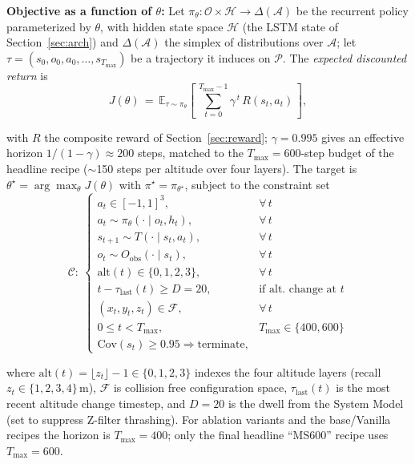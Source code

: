 \documentclass[runningheads]{llncs}
\begin{document}
\noindent\textbf{Objective as a function of $\theta$:} Let $\pi_\theta\!:\!\mathcal{O}\!\times\!\mathcal{H}\!\to\!\Delta(\mathcal{A})$ be the recurrent policy parameterized by $\theta$, with hidden state space $\mathcal{H}$ (the LSTM state of Section~\ref{sec:arch}) and $\Delta(\mathcal{A})$ the simplex of distributions over $\mathcal{A}$; let $\tau\!=\!(s_0,o_0,a_0,\ldots,s_{T_{\max}})$ be a trajectory it induces on $\mathcal{P}$. The \emph{expected discounted return} is
\vspace{-2pt}
\begin{equation}
J(\theta) \,=\, \mathbb{E}_{\tau\sim\pi_\theta}\!\left[\,\sum_{t=0}^{T_{\max}-1}\gamma^{\,t}\, R(s_t,a_t)\,\right],
\label{eq:J}
\end{equation}
\vspace{-4pt}

\noindent with $R$ the composite reward of Section~\ref{sec:reward}; $\gamma\!=\!0.995$ gives an effective horizon $1/(1-\gamma)\!\approx\!200$ steps, matched to the $T_{\max}\!=\!600$-step budget of the headline recipe ($\sim$150 steps per altitude over four layers). The target is $\theta^{\star} = \arg\max_{\theta} J(\theta)$ with $\pi^{\star} = \pi_{\theta^{\star}}$, subject to the constraint set
\vspace{-4pt}
{\renewcommand{\arraystretch}{0.80}%
\begin{equation}
\mathcal{C}:\
\begin{cases}
a_t \in [-1,1]^3, & \forall\, t \\
a_t \sim \pi_\theta(\cdot\!\mid\!o_t,h_t), & \forall\, t \\
s_{t+1} \sim T(\cdot\!\mid\!s_t,a_t), & \forall\, t \\
o_t \sim O_{\text{obs}}(\cdot\!\mid\!s_t), & \forall\, t \\
\mathrm{alt}(t) \in \{0,1,2,3\}, & \forall\, t \\
t - \tau_{\text{last}}(t) \geq D = 20, & \text{if alt.\ change at } t \\
(x_t, y_t, z_t) \in \mathcal{F}, & \forall\, t \\
0 \leq t < T_{\max}, & T_{\max}\!\in\!\{400,600\} \\
\mathrm{Cov}(s_t)\!\geq\!0.95 \Rightarrow \text{terminate}, &
\end{cases}
\label{eq:constraints}
\end{equation}}%
\vspace{-4pt}

\noindent where $\mathrm{alt}(t)\!=\!\lfloor z_t\rfloor\!-\!1\!\in\!\{0,1,2,3\}$ indexes the four altitude layers (recall $z_t\!\in\!\{1,2,3,4\}\,\text{m}$), $\mathcal{F}$ is collision free configuration space, $\tau_{\text{last}}(t)$ is the most recent altitude change timestep, and $D\!=\!20$ is the dwell from the System Model (set to suppress Z-filter thrashing). For ablation variants and the base/Vanilla recipes the horizon is $T_{\max}\!=\!400$; only the final headline ``MS600'' recipe uses $T_{\max}\!=\!600$.
\end{document}
